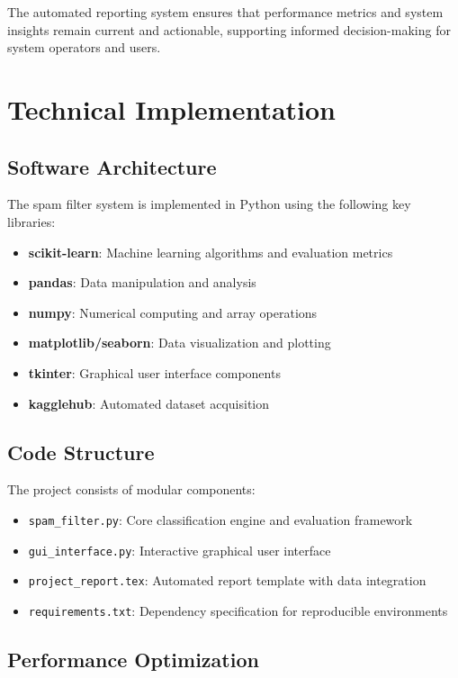 \documentclass[12pt,a4paper]{article}
\begin{document}
The automated reporting system ensures that performance metrics and system insights remain current and actionable, supporting informed decision-making for system operators and users.

\section{Technical Implementation}

\subsection{Software Architecture}

The spam filter system is implemented in Python using the following key libraries:

\begin{itemize}
    \item \textbf{scikit-learn}: Machine learning algorithms and evaluation metrics
    \item \textbf{pandas}: Data manipulation and analysis
    \item \textbf{numpy}: Numerical computing and array operations
    \item \textbf{matplotlib/seaborn}: Data visualization and plotting
    \item \textbf{tkinter}: Graphical user interface components
    \item \textbf{kagglehub}: Automated dataset acquisition
\end{itemize}

\subsection{Code Structure}

The project consists of modular components:

\begin{itemize}
    \item \texttt{spam\_filter.py}: Core classification engine and evaluation framework
    \item \texttt{gui\_interface.py}: Interactive graphical user interface
    \item \texttt{project\_report.tex}: Automated report template with data integration
    \item \texttt{requirements.txt}: Dependency specification for reproducible environments
\end{itemize}

\subsection{Performance Optimization}
\end{document}
